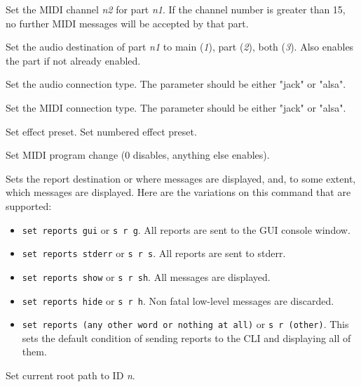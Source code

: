       Set the MIDI channel \textsl{n2} for part \textsl{n1}.
      If the channel number is greater than 15, no further MIDI
      messages will be accepted by that part.

      Set the audio destination of part \textsl{n1}
      to main (\textsl{1}), part (\textsl{2}), both (\textsl{3}).
      Also enables the part if not already enabled.

      Set the audio connection type.
      The parameter should be either "jack" or "alsa".

      Set the MIDI connection type.
      The parameter should be either "jack" or "alsa".

      Set effect preset.
      Set numbered effect preset.

      Set MIDI program change (0 disables, anything else enables).

      Sets the report destination or where messages are displayed, and, to some
      extent, which messages are displayed.  Here are the variations on this
      command that are supported:

      \begin{itemize}
         \item \texttt{set reports gui} or \texttt{s r g}.
            All reports are sent to the GUI console window.
         \item \texttt{set reports stderr} or \texttt{s r s}.
            All reports are sent to stderr.
         \item \texttt{set reports show} or \texttt{s r sh}.
            All messages are displayed.
         \item \texttt{set reports hide} or \texttt{s r h}.
            Non fatal low-level messages are discarded.
         \item \texttt{set reports (any other word or nothing at all)} or
            \texttt{s r (other)}.
            This sets the default condition of sending reports to the CLI and
            displaying all of them.
      \end{itemize}

      Set current root path to ID \textsl{n}.

